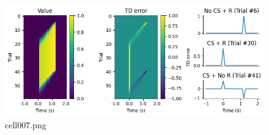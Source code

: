 \begin{figure}[ht]
	\centering
	\includegraphics[scale=0.8, max width=\linewidth]{./fig/reinforcement-learning/td-learning/cell007.png}
	\caption{cell007.png}
	\label{cell007.png}
\end{figure}